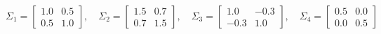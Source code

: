 \documentclass{article}
\begin{document}
\begin{itemize}
\[    \]
    \[
    \Sigma_1 = \begin{bmatrix} 1.0 & 0.5 \\ 0.5 & 1.0 \end{bmatrix}, \quad \Sigma_2 = \begin{bmatrix} 1.5 & 0.7 \\ 0.7 & 1.5 \end{bmatrix}, \quad \Sigma_3 = \begin{bmatrix} 1.0 & -0.3 \\ -0.3 & 1.0 \end{bmatrix}, \quad \Sigma_4 = \begin{bmatrix} 0.5 & 0.0 \\ 0.0 & 0.5 \end{bmatrix}
    \]
\end{itemize}
\end{document}
